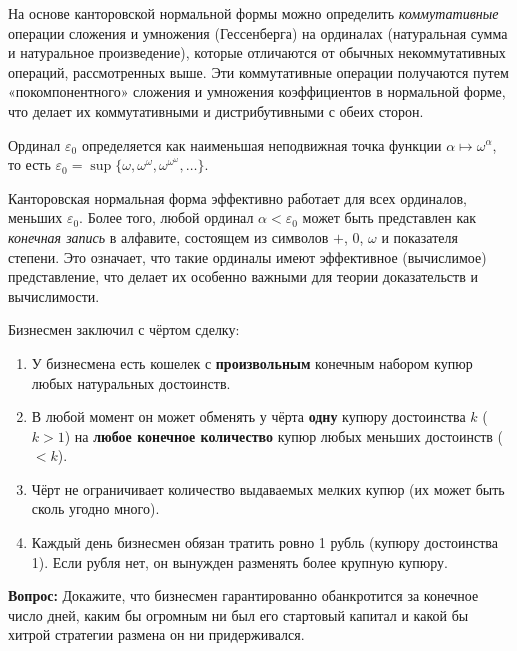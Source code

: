 \documentclass[11pt, a4paper]{extarticle}
\newcommand{\al}{\alpha}
\newcommand{\ep}{\varepsilon}
\newcommand{\om}{\omega}
\begin{document}
    \begin{remark}
    На основе канторовской нормальной формы можно определить \textit{коммутативные} операции сложения и умножения (Гессенберга) на ординалах (натуральная сумма и натуральное произведение), которые отличаются от обычных некоммутативных операций, рассмотренных выше. Эти коммутативные операции получаются путем «покомпонентного» сложения и умножения коэффициентов в нормальной форме, что делает их коммутативными и дистрибутивными с обеих сторон.
    \end{remark}
    
    \begin{remark}[Ординал $\ep_0$ и эффективность КНФ]
    Ординал $\ep_0$ определяется как наименьшая неподвижная точка функции $\al \mapsto \om^\al$, то есть $\ep_0 = \sup\{\om, \om^\om, \om^{\om^\om}, \dots\}$.
    
    Канторовская нормальная форма эффективно работает для всех ординалов, меньших $\ep_0$. Более того, любой ординал $\al < \ep_0$ может быть представлен как \textit{конечная запись} в алфавите, состоящем из символов $+$, $0$, $\om$ и показателя степени. Это означает, что такие ординалы имеют эффективное (вычислимое) представление, что делает их особенно важными для теории доказательств и вычислимости.
    \end{remark}
    
\begin{exercise}
Бизнесмен заключил с чёртом сделку:
\begin{enumerate}
    \item У бизнесмена есть кошелек с \textbf{произвольным} конечным набором купюр любых натуральных достоинств.
    \item В любой момент он может обменять у чёрта \textbf{одну} купюру достоинства $k$ ($k>1$) на \textbf{любое конечное количество} купюр любых меньших достоинств ($<k$).
    \item Чёрт не ограничивает количество выдаваемых мелких купюр (их может быть сколь угодно много).
    \item Каждый день бизнесмен обязан тратить ровно 1 рубль (купюру достоинства 1). Если рубля нет, он вынужден разменять более крупную купюру.
\end{enumerate}
\textbf{Вопрос:} Докажите, что бизнесмен гарантированно обанкротится за конечное число дней, каким бы огромным ни был его стартовый капитал и какой бы хитрой стратегии размена он ни придерживался.
\end{exercise}
\end{document}
